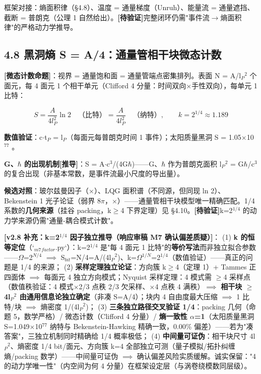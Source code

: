 \documentclass[12pt]{article}
\newcommand{\mtag}[1]{\textbf{[#1]}}
\newcommand{\up}[1]{\ensuremath{^{#1}}}
\newcommand{\down}[1]{\ensuremath{_{#1}}}
\begin{document}
框架对接：熵面积律（\S{}4.8）、温度 = 通量梯度（Unruh）、能量流 = 通量遮挡、截断 = 普朗克（公理 1 自然给出）。\mtag{待验证}完整闭环仍需"事件流\ensuremath{\to}熵面积律"的严格动力学推导。

\subsection{4.8 黑洞熵 S = A/4：通量管相干块微态计数}

\textbf{\mtag{微态计数命题}}：视界 = 通量饱和面 = 通量管端点密集排列。表面 N = A/l\down{P}\up{2} 个面元，每 4 面元 1 个相干单元（Clifford 4 分量：时间双向\ensuremath{\times}手性双向），每单元 1 比特：

\[S = \frac{A}{4l_P^2}\ln 2 \quad\text{（比特）} = \frac{A}{4l_P^2}\quad\text{（纳特）},\qquad k = 2^{1/4} \approx 1.189\]

\textbf{数值验证}：c\ensuremath{\cdot}t\down{P} = l\down{P}（每面元每普朗克时间 1 事件）；太阳质量黑洞 S = 1.05\ensuremath{\times}10\up{77} \checkmark。

\textbf{G、\ensuremath{\hbar} 的出现机制}\mtag{推导}：S = A\ensuremath{\cdot}c\up{3}/(4G\ensuremath{\hbar})------G、\ensuremath{\hbar} 作为普朗克面积 l\down{P}\up{2} = G\ensuremath{\hbar}/c\up{3} 的复合出现（非基本常数，是事件流最小尺度的导出量）。

\textbf{候选对照}：玻尔兹曼因子（\ensuremath{\times}）、LQG 面积谱（不同源，但同现 ln 2）、Bekenstein 1 光子论证（弱界 8\ensuremath{\pi}，\ensuremath{\times}）------通量管相干块模型唯一精确匹配。1/4 系数的\textbf{几何来源}（挂谷 packing，k\ensuremath{\geq}4 下界定理）见 \S{}4.10。\mtag{待验证}k=2\up{1/4} 的动力学来源仍需"通量-耦合模式计数"。

\textbf{\mtag{v2.8 补充：k=2\up{1/4} 因子独立推导（响应审稿 M7 确认偏差质疑）}}：
(1) \textbf{k 的恒等定位}（`\down{m7}\down{factor}.py`）：k=2\up{1/4} 是"每 4 面元 1 比特"的\textbf{等价写法}而非独立拟合参数------\ensuremath{\Omega}=2\up{N/4} \ensuremath{\implies} S\down{bit}=N/4=A/(4l\down{P}\up{2})、k=\ensuremath{\Omega}\up{1/N}=2\up{1/4}（数值验证）------真正的问题是 1/4 的来源；
(2) \textbf{采样定理独立论证}：方向簇 k\ensuremath{\geq}4（定理 1）+ Tammes 正四面体 \ensuremath{\implies} 每面元 4 独立方向模式；Nyquist 采样定理：4 模式需 \ensuremath{\geq}4 采样点（数值秩验证：4 模式\ensuremath{\times}2/3 点秩 2/3 欠采样、\ensuremath{\times}4 点秩 4 满秩）\ensuremath{\implies} \textbf{相干块 \ensuremath{\geq} 4l\down{P}\up{2} 由通用信息论独立确定}（非凑 S=A/4）；块内 4 自由度最大压缩 \ensuremath{\implies} 1 比特/块 \ensuremath{\implies} 熵密度 1/(4l\down{P}\up{2})；
(3) \textbf{三条独立路径交叉验证 1/4}：packing 几何（命题 5，数学严格）/ 微态计数（Clifford 4 分量）/ \textbf{熵一致性 \ensuremath{\alpha}=1}（太阳质量黑洞 S=1.049\ensuremath{\times}10\up{77} 纳特与 Bekenstein-Hawking 精确一致，0.00\% 偏差）------若为"凑答案"，三独立机制同时精确给 1/4 概率极低；
(4) \textbf{中间量可证伪}：相干块尺寸 4l\down{P}\up{2}、熵密度 1/4 bit/面元、方向簇 k=4 全部独立可测（量子模拟/拓扑纠缠熵/packing 数学）------中间量可证伪 \ensuremath{\implies} 确认偏差风险实质缓解。诚实保留："4 的动力学唯一性"（内空间为何 4 分量）在框架设定层（与涡卷绕模数同层级）。
\end{document}

